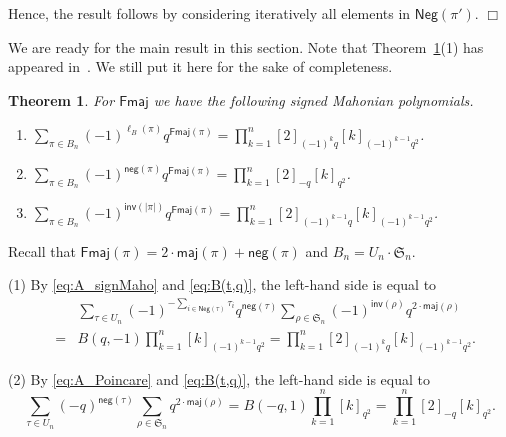 \documentclass[a4paper, reqno, 11pt]{amsart}
\newtheorem{thm}[lem]{Theorem}
\newcommand{\maj}{{\textsf{maj}}}
\newcommand{\inv}{{\textsf{inv}}}
\newcommand{\Nega}{{\textsf{Neg}}}
\newcommand{\nega}{{\textsf{neg}}}
\newcommand{\Fmaj}{{\textsf{Fmaj}}}
\numberwithin{equation}{section}
\renewcommand{\d}{\displaystyle}
\def\proof{\noindent{\bf Proof.\quad}}
\def\qed{\hspace*{\fill} $\Box$ \medskip}
\begin{document}
Hence, the result follows by considering iteratively all elements in $\Nega(\pi')$.
\qed

We are ready for the main result in this section.
Note that Theorem~\ref{thm:B_Fmaj}(1) has appeared in~\cite[Theorem 5.7]{Fire_08}.
We still put it here for the sake of completeness.


\begin{thm}\label{thm:B_Fmaj}
For $\Fmaj$ we have the following signed Mahonian polynomials.
\begin{enumerate}
\item $\d\sum_{\pi\in B_n}(-1)^{\ell_B(\pi)}q^{\Fmaj(\pi)}=\prod_{k=1}^n[2]_{(-1)^kq}[k]_{(-1)^{k-1}q^2}$.
\item $\d\sum_{\pi\in B_n}(-1)^{\nega(\pi)}q^{\Fmaj(\pi)} =\prod_{k=1}^n[2]_{-q}[k]_{q^2}$.
\item $\d\sum_{\pi\in B_n}(-1)^{\inv(|\pi|)}q^{\Fmaj(\pi)} =\prod_{k=1}^n[2]_{(-1)^{k-1}q}[k]_{(-1)^{k-1}q^2}$.

\end{enumerate}
\end{thm}
\proof 
Recall that $\Fmaj(\pi)=2\cdot\maj(\pi)+\nega(\pi)$ and $B_n=U_n\cdot\mathfrak{S}_n$.

(1) By \eqref{eq:A_signMaho} and \eqref{eq:B(t,q)},
the left-hand side is equal to
\begin{eqnarray*}
&&\sum_{\tau\in U_n}(-1)^{-\sum_{i\in\Nega(\tau)}\tau_i}q^{\nega(\tau)} \sum_{\rho\in \mathfrak{S}_n}(-1)^{\inv(\rho)}q^{2\cdot\maj(\rho)}\\
&=& B(q,-1)\prod_{k=1}^n[k]_{(-1)^{k-1}q^2} = \prod_{k=1}^n[2]_{(-1)^kq}[k]_{(-1)^{k-1}q^2}.
\end{eqnarray*}

(2) By \eqref{eq:A_Poincare} and \eqref{eq:B(t,q)}, the left-hand side is equal to
$$\sum_{\tau\in U_n}(-q)^{\nega(\tau)} \sum_{\rho\in \mathfrak{S}_n}q^{2\cdot\maj(\rho)}
= B(-q,1)\prod_{k=1}^n[k]_{q^2} = \prod_{k=1}^n[2]_{-q}[k]_{q^2}.$$
\end{document}
